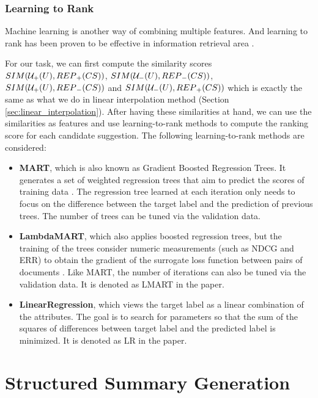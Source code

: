 \subsubsection{Learning to Rank} 
\label{sec:learning_to_rank}

Machine learning is another way of combining multiple 
features. And learning to rank has been proven to be effective in 
information retrieval area 
\cite{Liu:2009:LRI:1618303.1618304, 
Macdonald:2013:WHL:2559123.2559126}. 

For our task, we can first compute the similarity scores 
\\$SIM({\cal U}_{+}(U),{REP}_{+}(CS))$, 
$SIM({\cal U}_{-}(U),{REP}_{-}(CS))$, 
\\$SIM({\cal U}_{+}(U),{REP}_{-}(CS))$ and 
$SIM({\cal U}_{-}(U),{REP}_{+}(CS))$ 
which is exactly the same as what we do in linear 
interpolation method (Section \ref{sec:linear_interpolation}).
After having these similarities at hand, we can use the 
similarities as features and use learning-to-rank 
methods to compute the ranking score for each candidate 
suggestion. The following learning-to-rank methods 
are considered: 
\begin{itemize}
\item \textbf{MART}, which is also known as Gradient Boosted 
Regression Trees. It generates a set of weighted regression 
trees that aim to predict the scores of training data 
\cite{Friedman00greedyfunction}. The regression tree learned 
at each iteration only needs to focus on the difference 
between the target label and the prediction of previous 
trees. The number of trees can be tuned via the validation 
data.
\item \textbf{LambdaMART}, which also applies boosted 
regression trees, but the training of the trees consider 
numeric measurements (such as NDCG and ERR) to obtain the 
gradient of the surrogate loss function between pairs of 
documents \cite{burges2010ranknet}. 
Like MART, the number of iterations can also be 
tuned via the validation data. It is denoted as LMART 
in the paper. 
\item \textbf{LinearRegression}, which views the target label 
as a linear combination of the attributes. The goal is to 
search for parameters so that the sum of the squares of 
differences between target label and the predicted label is 
minimized. It is denoted as LR in the paper. 
\end{itemize} 

\section {Structured Summary Generation}  
\label{sec:summ} 

